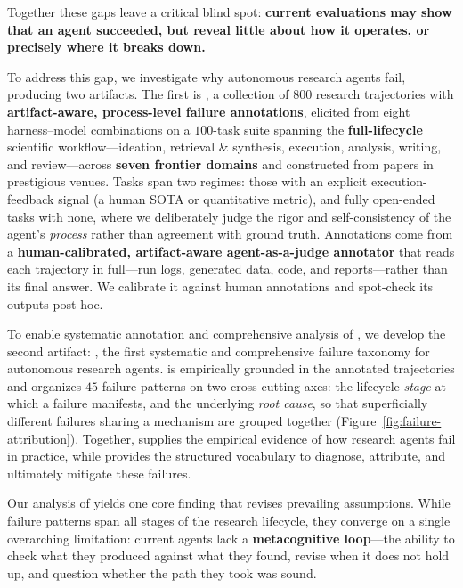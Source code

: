Together these gaps leave a critical blind spot: \textbf{current evaluations may show that an agent succeeded, but reveal little about how it operates, or precisely where it breaks down.}




To address this gap, we investigate why autonomous research agents fail, producing two artifacts. The first is \textbf{\bench}, a collection of $800$ research trajectories with \textbf{artifact-aware, process-level failure annotations}, elicited from eight harness--model combinations on a $100$-task suite spanning the \textbf{full-lifecycle} scientific workflow---ideation, retrieval \& synthesis, execution, analysis, writing, and review---across \textbf{seven frontier domains} and constructed from papers in prestigious venues. Tasks span two regimes: those with an explicit execution-feedback signal (a human SOTA or quantitative metric), and fully open-ended tasks with none, where we deliberately judge the rigor and self-consistency of the agent's \emph{process} rather than agreement with ground truth. Annotations come from a \textbf{human-calibrated, artifact-aware agent-as-a-judge annotator} \citep{zhuge2024agentjudge} that reads each trajectory in full---run logs, generated data, code, and reports---rather than its final answer. We calibrate it against human annotations and spot-check its outputs post hoc.

To enable systematic annotation and comprehensive analysis of \bench, we develop the
second artifact: \textbf{\taxonomy}, the first systematic and comprehensive
failure taxonomy for autonomous research agents. \taxonomy is empirically
grounded in the annotated trajectories and organizes $45$ failure patterns
on two cross-cutting axes: the lifecycle \emph{stage} at which a failure
manifests, and the underlying \emph{root cause}, so that superficially
different failures sharing a mechanism are grouped together
(Figure~\ref{fig:failure-attribution}). Together, \bench supplies the
empirical evidence of how research agents fail in practice, while \taxonomy
provides the structured vocabulary to diagnose, attribute, and ultimately
mitigate these failures.

Our analysis of \bench yields one core finding that revises prevailing
assumptions. While failure patterns span all stages of the research
lifecycle, they converge on a single overarching limitation: current agents
lack a \textbf{metacognitive loop}---the ability to check what they produced
against what they found, revise when it does not hold up, and question whether
the path they took was sound.


